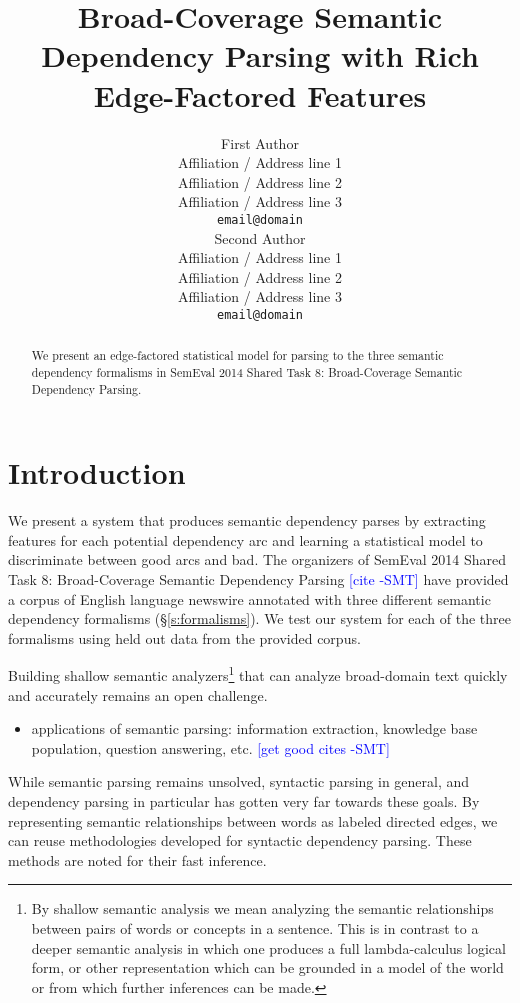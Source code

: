 \documentclass[11pt]{article}
\title{Broad-Coverage Semantic Dependency Parsing with Rich Edge-Factored
Features}
\author{First Author \\
  Affiliation / Address line 1 \\
  Affiliation / Address line 2 \\
  Affiliation / Address line 3 \\
  {\tt email@domain} \\\And
  Second Author \\
  Affiliation / Address line 1 \\
  Affiliation / Address line 2 \\
  Affiliation / Address line 3 \\
  {\tt email@domain} \\}
\date{}
\newcommand{\sam}[1]{\textcolor{blue}{[#1 -SMT]}}
\begin{document}
\maketitle

\begin{abstract}
We present an edge-factored statistical model for parsing to the three semantic
dependency formalisms in SemEval 2014 Shared Task 8: Broad-Coverage Semantic
Dependency Parsing.

\end{abstract}



\section{Introduction}

We present a system that produces semantic dependency parses by extracting
features for each potential dependency arc and learning a statistical model to
discriminate between good arcs and bad.
The organizers of SemEval 2014 Shared Task 8: Broad-Coverage Semantic Dependency
Parsing \sam{cite} have provided a corpus of English language newswire
annotated with three different semantic dependency formalisms
(\S\ref{s:formalisms}).
We test our system for each of the three formalisms using held out data
from the provided corpus.

Building shallow semantic analyzers\footnote{By shallow semantic analysis we
mean analyzing the semantic relationships between pairs of words or concepts in
a sentence.
This is in contrast to a deeper semantic analysis in which one produces a full
lambda-calculus logical form, or other representation which can be grounded in a
model of the world or from which further inferences can be made.
}
that can analyze broad-domain text quickly
and accurately remains an open challenge.
\begin{itemize}
\item applications of semantic parsing: information extraction, knowledge base
population, question answering, etc. \sam{get good cites}
\end{itemize}
While semantic parsing remains unsolved, syntactic parsing in general, and
dependency parsing in particular has gotten very far towards these goals.
By representing semantic relationships between words as labeled
directed edges, we can reuse methodologies developed for syntactic dependency
parsing.
These methods are noted for their fast inference.
\end{document}
